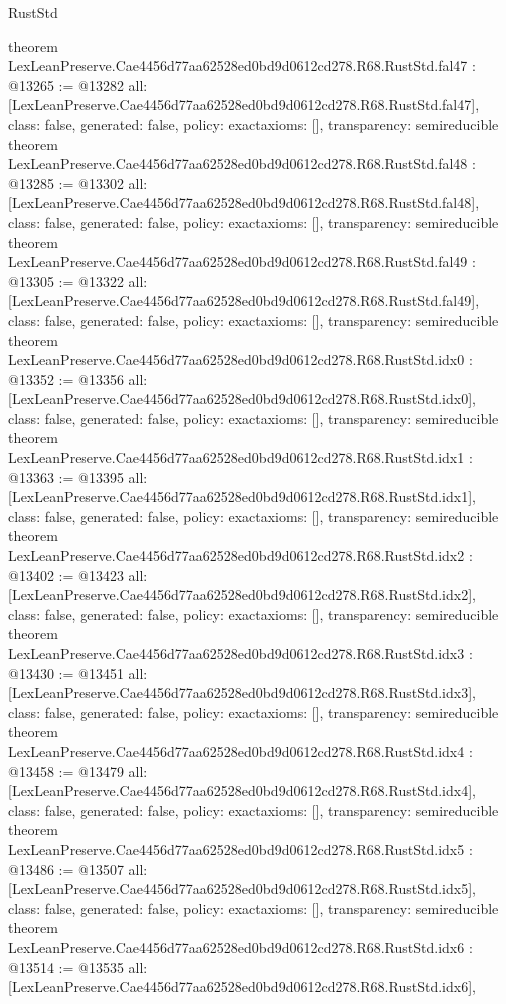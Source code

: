 \begin{lexlean}{RustStd}
\begin{coremodule}
{}
theorem LexLeanPreserve.Cae4456d77aa62528ed0bd9d0612cd278.R68.RustStd.fal47 : @13265 := @13282 {
  all: [LexLeanPreserve.Cae4456d77aa62528ed0bd9d0612cd278.R68.RustStd.fal47],
  class: false,
  generated: false,
  policy: exact{axioms: []},
  transparency: semireducible
}
theorem LexLeanPreserve.Cae4456d77aa62528ed0bd9d0612cd278.R68.RustStd.fal48 : @13285 := @13302 {
  all: [LexLeanPreserve.Cae4456d77aa62528ed0bd9d0612cd278.R68.RustStd.fal48],
  class: false,
  generated: false,
  policy: exact{axioms: []},
  transparency: semireducible
}
theorem LexLeanPreserve.Cae4456d77aa62528ed0bd9d0612cd278.R68.RustStd.fal49 : @13305 := @13322 {
  all: [LexLeanPreserve.Cae4456d77aa62528ed0bd9d0612cd278.R68.RustStd.fal49],
  class: false,
  generated: false,
  policy: exact{axioms: []},
  transparency: semireducible
}
theorem LexLeanPreserve.Cae4456d77aa62528ed0bd9d0612cd278.R68.RustStd.idx0 : @13352 := @13356 {
  all: [LexLeanPreserve.Cae4456d77aa62528ed0bd9d0612cd278.R68.RustStd.idx0],
  class: false,
  generated: false,
  policy: exact{axioms: []},
  transparency: semireducible
}
theorem LexLeanPreserve.Cae4456d77aa62528ed0bd9d0612cd278.R68.RustStd.idx1 : @13363 := @13395 {
  all: [LexLeanPreserve.Cae4456d77aa62528ed0bd9d0612cd278.R68.RustStd.idx1],
  class: false,
  generated: false,
  policy: exact{axioms: []},
  transparency: semireducible
}
theorem LexLeanPreserve.Cae4456d77aa62528ed0bd9d0612cd278.R68.RustStd.idx2 : @13402 := @13423 {
  all: [LexLeanPreserve.Cae4456d77aa62528ed0bd9d0612cd278.R68.RustStd.idx2],
  class: false,
  generated: false,
  policy: exact{axioms: []},
  transparency: semireducible
}
theorem LexLeanPreserve.Cae4456d77aa62528ed0bd9d0612cd278.R68.RustStd.idx3 : @13430 := @13451 {
  all: [LexLeanPreserve.Cae4456d77aa62528ed0bd9d0612cd278.R68.RustStd.idx3],
  class: false,
  generated: false,
  policy: exact{axioms: []},
  transparency: semireducible
}
theorem LexLeanPreserve.Cae4456d77aa62528ed0bd9d0612cd278.R68.RustStd.idx4 : @13458 := @13479 {
  all: [LexLeanPreserve.Cae4456d77aa62528ed0bd9d0612cd278.R68.RustStd.idx4],
  class: false,
  generated: false,
  policy: exact{axioms: []},
  transparency: semireducible
}
theorem LexLeanPreserve.Cae4456d77aa62528ed0bd9d0612cd278.R68.RustStd.idx5 : @13486 := @13507 {
  all: [LexLeanPreserve.Cae4456d77aa62528ed0bd9d0612cd278.R68.RustStd.idx5],
  class: false,
  generated: false,
  policy: exact{axioms: []},
  transparency: semireducible
}
theorem LexLeanPreserve.Cae4456d77aa62528ed0bd9d0612cd278.R68.RustStd.idx6 : @13514 := @13535 {
  all: [LexLeanPreserve.Cae4456d77aa62528ed0bd9d0612cd278.R68.RustStd.idx6],
}
\end{coremodule}
\end{lexlean}
